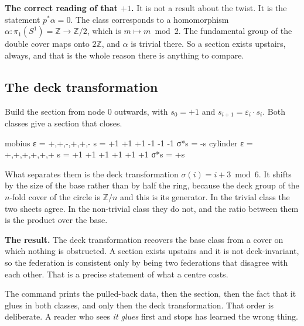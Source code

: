 \documentclass[11pt,a4paper]{article}
\begin{document}
\begin{alarmbox}
\textbf{The correct reading of that $+1$.} It is not a result about the twist. It is
the statement $p^*\alpha = 0$. The class corresponds to a homomorphism
$\alpha : \pi_1(S^1) = \mathbb{Z} \to \mathbb{Z}/2$, which is $m \mapsto m \bmod 2$.
The fundamental group of the double cover maps onto $2\mathbb{Z}$, and $\alpha$ is
trivial there. So a section exists upstairs, always, and that is the whole reason
there is anything to compare.
\end{alarmbox}

\subsection{The deck transformation}

Build the section from node $0$ outwards, with $s_0 = +1$ and
$s_{i+1} = \varepsilon_i \cdot s_i$. Both classes give a section that closes.

\begin{term}
mobius    ε = +,+,-,+,+,-      s = +1 +1 +1 -1 -1 -1      σ*s = -s
cylinder  ε = +,+,+,+,+,+      s = +1 +1 +1 +1 +1 +1      σ*s = +s
\end{term}

What separates them is the deck transformation $\sigma(i) = i + 3 \bmod 6$. It shifts
by the size of the base rather than by half the ring, because the deck group of the
$n$-fold cover of the circle is $\mathbb{Z}/n$ and this is its generator. In the
trivial class the two sheets agree. In the non-trivial class they do not, and the
ratio between them is the product over the base.

\begin{sectionbox}
\textbf{The result.} The deck transformation recovers the base class from a cover on
which nothing is obstructed. A section exists upstairs and it is not deck-invariant,
so the federation is consistent only by being two federations that disagree with each
other. That is a precise statement of what a centre costs.
\end{sectionbox}

The command prints the pulled-back data, then the section, then the fact that it glues
in both classes, and only then the deck transformation. That order is deliberate. A
reader who sees \emph{it glues} first and stops has learned the wrong thing.
\end{document}
